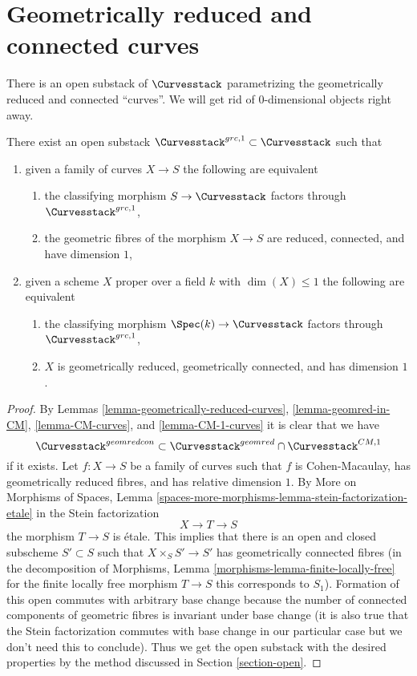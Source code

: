 \section{Geometrically reduced and connected curves}
\label{section-geometrically-reduced-connected}

\noindent
There is an open substack of $\Curvesstack$ parametrizing
the geometrically reduced and connected ``curves''.
We will get rid of $0$-dimensional objects right away.

\begin{lemma}
\label{lemma-geometrically-reduced-connected-1-curves}
There exist an open substack $\Curvesstack^{grc, 1} \subset \Curvesstack$
such that
\begin{enumerate}
\item given a family of curves $X \to S$ the following are equivalent
\begin{enumerate}
\item the classifying morphism $S \to \Curvesstack$ factors
through $\Curvesstack^{grc, 1}$,
\item the geometric fibres of the morphism $X \to S$ are
reduced, connected, and have dimension $1$,
\end{enumerate}
\item given a scheme $X$ proper over a field $k$ with $\dim(X) \leq 1$
the following are equivalent
\begin{enumerate}
\item the classifying morphism $\Spec(k) \to \Curvesstack$ factors
through $\Curvesstack^{grc, 1}$,
\item $X$ is geometrically reduced, geometrically connected,
and has dimension $1$.
\end{enumerate}
\end{enumerate}
\end{lemma}

\begin{proof}
By Lemmas \ref{lemma-geometrically-reduced-curves},
\ref{lemma-geomred-in-CM}, \ref{lemma-CM-curves}, and \ref{lemma-CM-1-curves}
it is clear that we have
$$
\Curvesstack^{geomredcon}
\subset
\Curvesstack^{geomred} \cap \Curvesstack^{CM, 1}
$$
if it exists. Let $f : X \to S$ be a family of curves such that $f$ is
Cohen-Macaulay, has geometrically reduced fibres, and
has relative dimension $1$. By
More on Morphisms of Spaces, Lemma
\ref{spaces-more-morphisms-lemma-stein-factorization-etale}
in the Stein factorization
$$
X \to T \to S
$$
the morphism $T \to S$ is \'etale. This implies that
there is an open and closed subscheme $S' \subset S$
such that $X \times_S S' \to S'$ has geometrically
connected fibres (in the decomposition of
Morphisms, Lemma \ref{morphisms-lemma-finite-locally-free}
for the finite locally free morphism $T \to S$
this corresponds to $S_1$).
Formation of this open commutes with arbitrary base change
because the number of connected components of geometric
fibres is invariant under base change (it is also true
that the Stein factorization commutes with base change
in our particular case but we don't need this to conclude).
Thus we get the open substack with the desired properties
by the method discussed in Section \ref{section-open}.
\end{proof}

